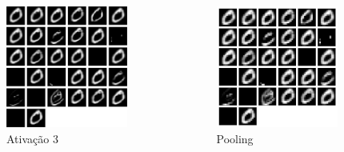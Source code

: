 \documentclass[tikz,10pt]{beamer}
\begin{document}
\begin{frame}
\begin{columns}
		\begin{column}{0.33\textwidth}
			\begin{figure}
				\includegraphics[height=4cm]{images/resultados/network_1/input_1_layer_activation_3}
				\caption{Ativação 3}
			\end{figure}%
		\end{column}
		\begin{column}{0.33\textwidth}
			\begin{figure}
				\includegraphics[height=4cm]{images/resultados/network_1/input_1_layer_maxpooling2d_1}%
				\caption{Pooling}			
			\end{figure}%
		\end{column}	
	\end{columns}
	
\end{frame}
\end{document}
